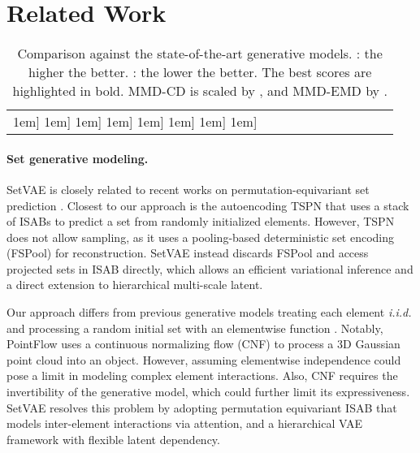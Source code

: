 \documentclass[final]{arxiv/cvpr}
\begin{document}
 \section{Related Work}
\label{sec:related}
\begin{table*}[htbp!]
\caption{Comparison against the state-of-the-art generative models. : the higher the better.
: the lower the better. The best scores are highlighted in bold. MMD-CD is scaled by , and MMD-EMD by .}
\vspace{-0.1in}
\footnotesize
\centering
\begin{adjustbox}{width=0.99\textwidth}
\label{table:pointeval}
\centering
\begin{tabular}{clccccccccc}
\Xhline{2\arrayrulewidth}
\-1em]\cline{3-4} \cline{5-6} \cline{7-8} \cline{9-10}
\-1em]\Xhline{2\arrayrulewidth}
\-1em]\cline{2-10}
    \-1em]\Xhline{2\arrayrulewidth}
\-1em]\cline{2-10}
    \-1em]\Xhline{2\arrayrulewidth}
\-1em]\cline{2-10}
    \-1em]\Xhline{2\arrayrulewidth}
\end{tabular}
\end{adjustbox}
\vspace{-0.1in}
\end{table*}
 

\paragraph{Set generative modeling.} SetVAE is closely related to recent works on permutation-equivariant set prediction \cite{zhang2020deep, kosiorek2020conditional, carion2020endtoend, locatello2020objectcentric, li2020exchangeable}.
Closest to our approach is the autoencoding TSPN \cite{kosiorek2020conditional} that uses a stack of ISABs \cite{lee2019set} to predict a set from randomly initialized elements.
However, TSPN does not allow sampling, as it uses a pooling-based deterministic set encoding (FSPool) \cite{zhang2020fspool} for reconstruction.
SetVAE instead discards FSPool and access projected sets in ISAB directly, which allows an efficient variational inference and a direct extension to hierarchical multi-scale latent.

Our approach differs from previous generative models treating each element \emph{i.i.d.} and processing a random initial set with an elementwise function \cite{edwards2017neural, yang2019pointflow, kim2020softflow}.
Notably, PointFlow \cite{yang2019pointflow} uses a continuous normalizing flow (CNF) to process a 3D Gaussian point cloud into an object.
However, assuming elementwise independence could pose a limit in modeling complex element interactions.
Also, CNF requires the invertibility of the generative model, which could further limit its expressiveness.
SetVAE resolves this problem by adopting permutation equivariant ISAB that models inter-element interactions via attention, and a hierarchical VAE framework with flexible latent dependency.
\end{document}
